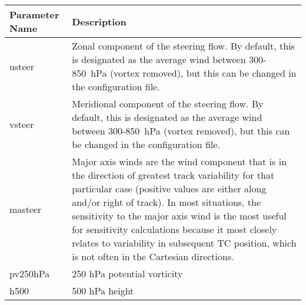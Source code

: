 \documentclass[psfig,12pt]{article}
\begin{document}
\begin{table}[H]
\begin{center}
\begin{tabular}{|p{1.25in}|p{5.0in}|}
\hline
Parameter Name & Description \\  \hline\hline
usteer & Zonal component of the steering flow.  By default, this is designated as the average wind between
300-850~hPa (vortex removed), but this can be changed in the configuration file. \\ \hline
vsteer & Meridional component of the steering flow.  By default, this is designated as the average wind between
300-850~hPa (vortex removed), but this can be changed in the configuration file. \\ \hline
masteer & Major axis winds are the wind component that is in the direction of greatest track variability for 
that particular case (positive values are either along and/or right of track).  In most situations, the 
sensitivity to the major axis wind is the most useful for sensitivity calculations because it most closely 
relates to variability in subsequent TC position, which is not often in the Cartesian directions.  \\ \hline
pv250hPa & 250 hPa potential vorticity \\ \hline
h500 & 500 hPa height \\ \hline
\end{tabular}
\end{center}
\end{table}
\end{document}
